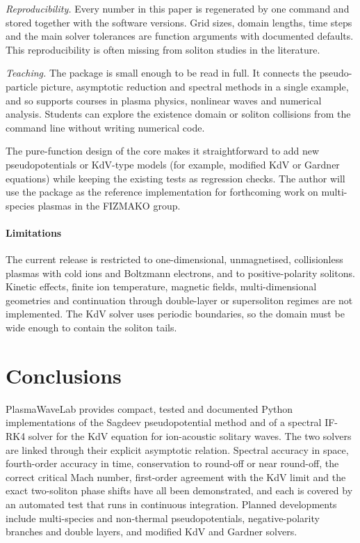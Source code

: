 \documentclass[preprint,12pt]{elsarticle}
\begin{document}
\emph{Reproducibility.} Every number in this paper is regenerated by one
command and stored together with the software versions. Grid sizes, domain lengths, time steps and the
main solver tolerances are function arguments with documented defaults. This
reproducibility is often missing from soliton studies in the literature.

\emph{Teaching.} The package is small enough to be read in full. It connects
the pseudo-particle picture, asymptotic reduction and spectral methods in a
single example, and so supports courses in plasma physics, nonlinear waves and
numerical analysis. Students can explore the existence domain or soliton
collisions from the command line without writing numerical code.

The pure-function design of the core makes it straightforward to add new
pseudopotentials or KdV-type models (for example, modified KdV or
Gardner equations) while keeping the existing tests as regression checks. The
author will use the package as the reference implementation for forthcoming work
on multi-species plasmas in the FIZMAKO group.

\paragraph{Limitations} The current release is restricted to one-dimensional,
unmagnetised, collisionless plasmas with cold ions and Boltzmann electrons, and
to positive-polarity solitons. Kinetic effects, finite ion temperature,
magnetic fields, multi-dimensional geometries and continuation through
double-layer or supersoliton regimes are not implemented. The KdV solver uses
periodic boundaries, so the domain must be wide enough to contain the soliton
tails.

\section{Conclusions}
\label{sec:conclusions}

PlasmaWaveLab provides compact, tested and documented Python implementations of
the Sagdeev pseudopotential method and of a spectral IF-RK4 solver for the KdV
equation for ion-acoustic solitary waves. The two solvers are linked through
their explicit asymptotic relation. Spectral accuracy in space, fourth-order
accuracy in time, conservation to round-off or near round-off, the correct
critical Mach number, first-order agreement with the KdV limit and the exact
two-soliton phase shifts have all been demonstrated, and each is covered by an automated test that runs in continuous
integration. Planned developments
include multi-species and non-thermal pseudopotentials, negative-polarity
branches and double layers, and modified KdV and Gardner solvers.
\end{document}
